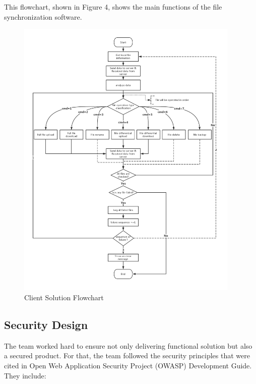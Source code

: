 \documentclass{article}
\begin{document}
\hfill \break
This flowchart, shown in Figure 4, shows the main functions of the file synchronization software.

\begin{figure}[H]
    \centering
    \includegraphics[width=0.95\textwidth]{flowchart}
    \caption{Client Solution Flowchart}
    \label{fig:flowchart1}
\end{figure}

\hfill \break

\subsection{Security Design}

The team worked hard to ensure not only delivering functional solution but also a secured product. For that, the team followed the security principles that were cited in Open Web Application Security Project (OWASP) Development Guide. They include:
\end{document}
